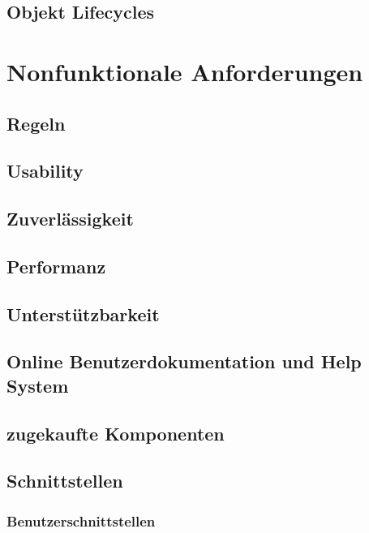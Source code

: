 \documentclass[a4paper,12pt,twoside]{scrreprt}
\begin{document}
    \section{Objekt Lifecycles}

    \chapter{Nonfunktionale Anforderungen  }
    \section{Regeln}
        
    \section{Usability}
        
    \section{Zuverlässigkeit}
        
    \section{Performanz}
        
    \section{Unterstützbarkeit}
        
    \section{Online Benutzerdokumentation und Help System}
        
    \section{zugekaufte Komponenten}
        
    \section{Schnittstellen}
    \subsection{Benutzerschnittstellen}
        
\end{document}
